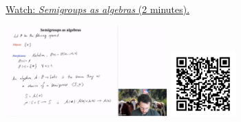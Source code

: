 
\begin{minipage}{10cm}
    \href{https://act4e-spring21.netlify.app/videos/spring2021-operads-b:semigroups-algebras.html}{Watch: \emph{Semigroups as algebras} (2 minutes).}
        
    \href{https://act4e-spring21.netlify.app/videos/spring2021-operads-b:semigroups-algebras.html}{\includegraphics[height=3.5cm]{spring2021-operads-b:semigroups-algebras/thumbnails.jpg}}
    \href{https://act4e-spring21.netlify.app/videos/spring2021-operads-b:semigroups-algebras.html}{\includegraphics[height=2.5cm]{spring2021-operads-b:semigroups-algebras/qrcode.png}}
\end{minipage}
